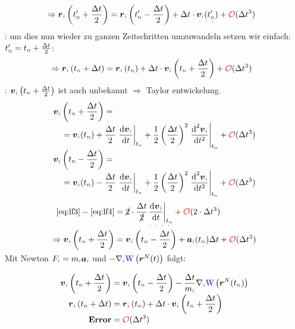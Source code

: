 \begin{sectionbox}
\begin{alignat*}{2}
    &\Rightarrow\rveci\left(\tnp+\frac{\Delta t}{2}\right)=\rveci\left(\tnp-\frac{\Delta t}{2}\right)+\Delta t\cdot\uldotted{\vveci(\tnp)}+\bigO{\Delta t^3}
  \end{alignat*}
  : um dies nun wieder zu ganzen Zeitschritten umzuwandeln setzen wir einfach: $\tnp=\tn+\frac{\Delta t}{2}$:
    \begin{align*}
      &\Rightarrow\rveci\left(\tn+\Delta t\right)=\rveci\left(\tn\right)+\Delta t\cdot\vveci\left(\tn+\frac{\Delta t}{2}\right)+\bigO{\Delta t^3}
    \end{align*}
    : $\vveci\left(\tn+\frac{\Delta t}{2}\right)$ ist auch unbekannt $\Rightarrow$ Taylor entwickelung.
  \begin{alignat}{2}
    &\vveci\left(\tn+\frac{\Delta t}{2}\right)=\label{eq:lf3}\nalign
                            &\quad=\vveci(\tn)+\frac{\Delta t}{2}\left.\difrac{\vveci}{t}\right\rvert_{\tn}+\frac{1}{2}\left(\frac{\Delta t}{2}\right)^2\left.\frac{\diff^2\vveci}{\diff t^2}\right\rvert_{\tn}+\bigO{\Delta t^3}\nonumber\nalign
    &\vveci\left(\tn-\frac{\Delta t}{2}\right)=\label{eq:lf4}\nalign &\quad=\vveci(\tn)-\frac{\Delta t}{2}\left.\difrac{\vveci}{t}\right\rvert_{\tn}+\frac{1}{2}\left(\frac{\Delta t}{2}\right)^2\left.\frac{\diff^2\vveci}{\diff t^2}\right\rvert_{\tn}+\bigO{\Delta t^3}\nonumber
  \end{alignat}
  \begin{alignat*}{2}
    \cref{eq:lf3}-\cref{eq:lf4}&=\cancel{2}\cdot\frac{\Delta t}{\cancel{2}}\uldotted[ulc2]{\left.\difrac{\vveci}{t}\right\rvert_{\tn}}+\bigO{2\cdot\Delta t^3}\nalign
    \Rightarrow\vveci\left(\tn+\frac{\Delta t}{2}\right)&=\vveci\left(\tn-\frac{\Delta t}{2}\right)+\uldotted[ulc2]{\aveci(\tn)}\Delta t+\bigO{\Delta t^3}\nalign
  \end{alignat*}
  Mit Newton $F_{\idxi}=m_{\idxi}\aveci$ und $-\nabla_{\idxi}\Wpot\left(\rvec^N(t)\right)$ folgt:
\end{sectionbox}
\begin{defnbox}\nospacing
  \begin{defn}
    \begin{alignat}{2}
      \vveci\left(\tn+\frac{\Delta t}{2}\right)&=\vveci\left(\tn-\frac{\Delta t}{2}\right)-\frac{\Delta t}{m_{\idxi}}\nabla_{\idxi}\Wpot\left(\rvec^N(\tn)\right)\nonumber\nalign
      \rveci\left(\tn+\Delta t\right)&=\rveci\left(\tn\right)+\Delta t\cdot\vveci\left(\tn+\frac{\Delta t}{2}\right)\nalign
                                                 \text{\imp{Error}}&=\bigO{\Delta t^3}\nonumber
    \end{alignat}
    \begin{figure}[H]	
      \centering{
        \vspace{-1em}
        \def\svgwidth{180pt}
        \resizebox{0.8\linewidth}{!}{}
      }
    \end{figure}
  \end{defn}
\end{defnbox}
